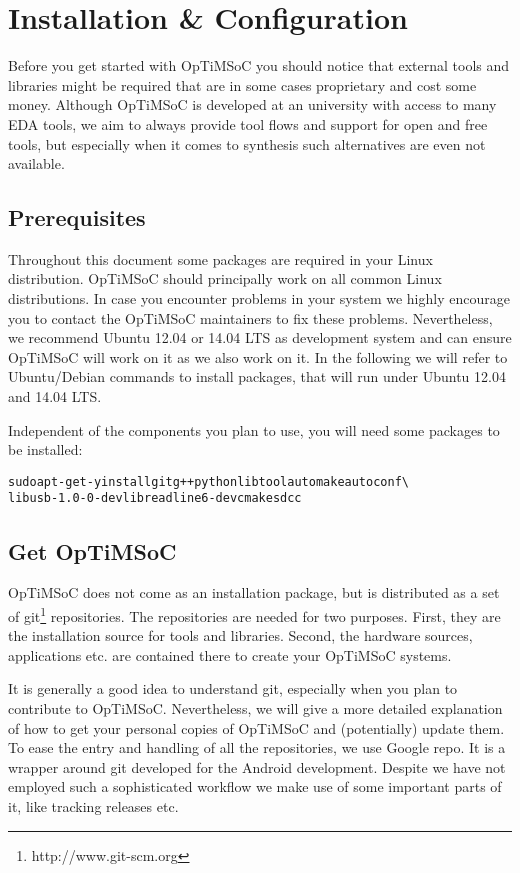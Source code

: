 \chapter{Installation \& Configuration}
\label{chap:installation}

Before you get started with OpTiMSoC you should notice that external
tools and libraries might be required that are in some cases
proprietary and cost some money. Although OpTiMSoC is developed at an
university with access to many EDA tools, we aim to always provide
tool flows and support for open and free tools, but especially when it
comes to synthesis such alternatives are even not available.

\section{Prerequisites}

Throughout this document some packages are required in your Linux
distribution. OpTiMSoC should principally work on all common Linux
distributions. In case you encounter problems in your system we highly
encourage you to contact the OpTiMSoC maintainers to fix these
problems. Nevertheless, we recommend Ubuntu 12.04 or 14.04 LTS as
development system and can ensure OpTiMSoC will work on it as we also
work on it. In the following we will refer to Ubuntu/Debian commands
to install packages, that will run under Ubuntu 12.04 and 14.04 LTS.

Independent of the components you plan to use, you will need some
packages to be installed:

\begin{alltt}
sudo apt-get -y install git g++ python libtool automake autoconf \textbackslash
    libusb-1.0-0-dev libreadline6-dev cmake sdcc
\end{alltt}

\section{Get OpTiMSoC}

OpTiMSoC does not come as an installation package, but is distributed
as a set of git\footnote{http://www.git-scm.org} repositories. The
repositories are needed for two purposes. First, they are the
installation source for tools and libraries. Second, the hardware
sources, applications etc. are contained there to create your OpTiMSoC
systems.

It is generally a good idea to understand git, especially when you
plan to contribute to OpTiMSoC. Nevertheless, we will give a more
detailed explanation of how to get your personal copies of OpTiMSoC
and (potentially) update them. To ease the entry and handling of all
the repositories, we use Google repo. It is a wrapper around git
developed for the Android development. Despite we have not employed
such a sophisticated workflow we make use of some important parts of
it, like tracking releases etc.

